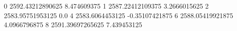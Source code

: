 0 2592.43212890625 8.474609375
1 2587.22412109375 3.2666015625
2 2583.95751953125 0.0
4 2583.6064453125 -0.35107421875
6 2588.05419921875 4.0966796875
8 2591.39697265625 7.439453125

